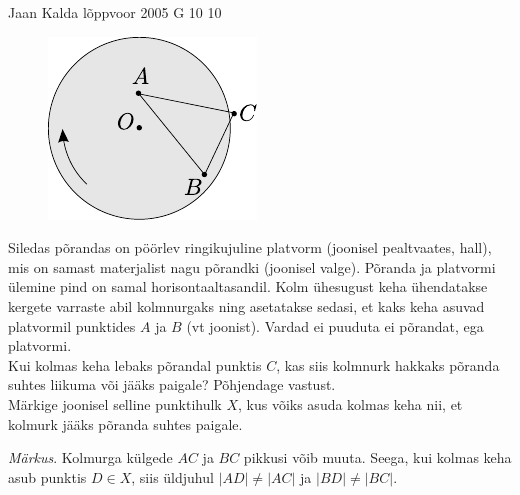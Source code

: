 \documentclass[11pt]{article}
\begin{document}
{%
{Jaan Kalda} %
{lõppvoor} %
{2005} %
{G 10} %
{10} %
{
\ifStatement
\begin{figure}
	\begin{center}
		\vspace{-20pt}
		\includegraphics[width=\linewidth]{2005-v3g-10-yl}
	\end{center}
\end{figure}
Siledas põrandas on pöörlev ringikujuline platvorm (joonisel pealtvaates, hall), mis on samast materjalist nagu põrandki (joonisel valge). Põranda ja platvormi ülemine pind on samal horisontaaltasandil. Kolm ühesugust keha ühendatakse kergete varraste abil kolmnurgaks ning asetatakse sedasi, et kaks keha asuvad platvormil punktides $A$ ja $B$ (vt joonist). Vardad ei puuduta ei põrandat, ega platvormi.\\
\osa Kui kolmas keha lebaks põrandal punktis $C$, kas siis kolmnurk hakkaks põranda suhtes liikuma või jääks paigale? Põhjendage vastust.\\
\osa Märkige joonisel selline punktihulk $X$, kus võiks asuda kolmas keha nii, et kolmurk jääks põranda suhtes paigale.

\emph{Märkus}. Kolmurga külgede $AC$ ja $BC$ pikkusi võib muuta. Seega, kui kolmas keha asub punktis $D \in X$, siis üldjuhul $|AD| \neq |AC|$ ja $|BD| \neq |BC|$.
\fi
}
\newpage\subsection{\protect{}}

}
\end{document}
